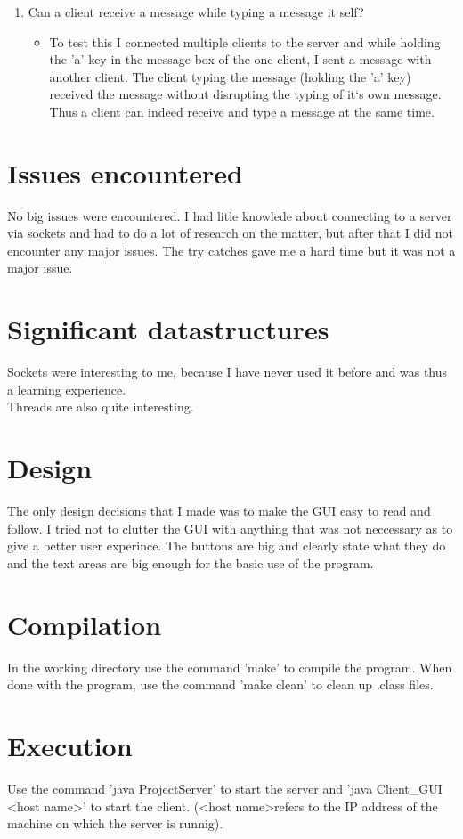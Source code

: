 \documentclass{article}
\begin{document}
\begin{enumerate}
	\item Can a client receive a message while typing a message it self?
	\begin{itemize}
		\item To test this I connected multiple clients to the server and while holding the 'a' key in the message box of the 
		one client, I sent a message with another client. The client typing the message (holding the 'a' key) received the message 
		without disrupting the typing of it`s own message. Thus a client can indeed receive and type a message at the same time.
	\end{itemize}
\end{enumerate}

\section{Issues encountered}
No big issues were encountered. I had litle knowlede about connecting to a server via sockets and had to do a lot of research on the 
matter, but after that I did not encounter any major issues. The try catches gave me a hard time but it was not a major issue.

\section{Significant datastructures}
Sockets were interesting to me, because I have never used it before and was thus a learning experience.\\
Threads are also quite interesting.

\section{Design}
The only design decisions that I made was to make the GUI easy to read and follow. I tried not to clutter the GUI with anything that was not 
neccessary as to give a better user experince. The buttons are big and clearly state what they do and the text areas are big enough for the 
basic use of the program.

\section{Compilation}
In the working directory use the command 'make' to compile the program. When done with the program, use the command 'make clean' to 
clean up .class files.

\section{Execution}
Use the command 'java ProjectServer' to start the server and 'java Client\_GUI 
\textless host name\textgreater ' to start the client. (\textless host name\textgreater refers to the IP address of the machine on 
which the server is runnig).
\end{document}
